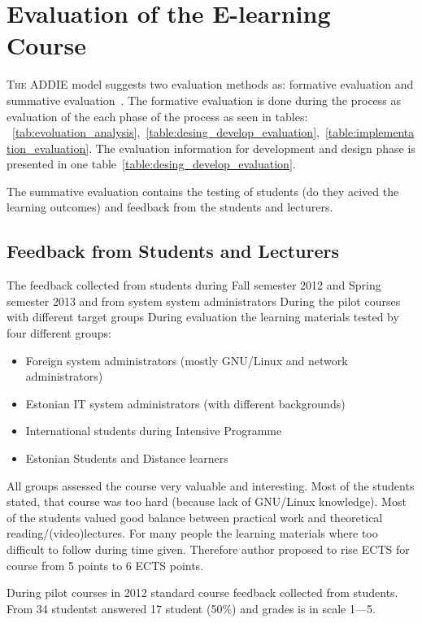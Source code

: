 \chapter{Evaluation of the E-learning Course}
\label{Evaluation of the E-learning Course}
\lettrine[lraise=0.1, nindent=0em, slope=-.5em]{\color{Violet}T}{he} \gls{ADDIE} model suggests two evaluation methods as: formative evaluation and summative evaluation~\citep{OppeArenduskeskus2010}. The formative evaluation is done during the process as evaluation of the each phase of the process as seen in tables: ~\ref{tab:evoluation_analysis},~\ref{table:desing_develop_evaluation},~\ref{table:implementation_evaluation}. 
The evaluation information for development and design phase is presented in one table~\ref{table:desing_develop_evaluation}.

The summative evaluation contains the testing of students (do they acived the learning outcomes) and feedback from the students and lecturers.
\section{Feedback from Students and Lecturers}
The feedback collected from students during Fall semester 2012 and Spring semester 2013 and from system system administrators
During the pilot courses with different target groups 
During evaluation the learning materials tested by four different groups:

\begin{itemize}
\item Foreign system administrators (mostly GNU/Linux and network administrators)
\item Estonian IT system administrators (with different backgrounds)
\item International students during Intensive Programme
\item Estonian Students and Distance learners
\end{itemize}

All groups assessed the course very valuable and interesting. Most of the students stated, that course was too hard (because lack of GNU/Linux knowledge). Most of the students valued good balance between practical work and theoretical reading/(video)lectures. For many people the learning materials where too difficult to follow during time given. Therefore author proposed to rise \gls{ECTS} for course from 5 points  to 6 \gls{ECTS} points.

During pilot courses in  2012 standard course feedback collected from students. From 34 studentst answered 17 student (50\%) and grades is in scale 1---5. 

